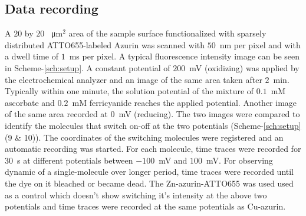 \subsection{Data recording}
A $20$ by $20$ \SI{}{\micro\metre}$^2$ area of the sample surface functionalized with sparsely distributed ATTO655-labeled Azurin was scanned with $50$~nm per pixel and with a dwell time of $1$~ms per pixel. A typical fluorescence intensity image can be seen in Scheme-\ref{sch:setup}. A constant potential of $200$~mV (oxidizing) was applied by the electrochemical analyzer and an image of the same area taken after $2$~min. Typically within one minute, the solution potential of the mixture of $0.1$~mM ascorbate and $0.2$~mM ferricyanide reaches the applied potential. Another image of the same area recorded at $0$~mV (reducing). The two images were compared to identify the molecules that switch on-off at the two potentials (Scheme-\ref{sch:setup} (9 \& 10)). The coordinates of the switching molecules were registered and an automatic recording was started. For each molecule, time traces were recorded for $30$~s at different potentials between $-100$~mV and $100$~mV. For observing dynamic of a single-molecule over longer period, time traces were recorded until the dye on it bleached or became dead. The Zn-azurin-ATTO655 was used used as a control which doesn't show switching it's intensity at the above two potentials and time traces were recorded at the same potentials as Cu-azurin.
